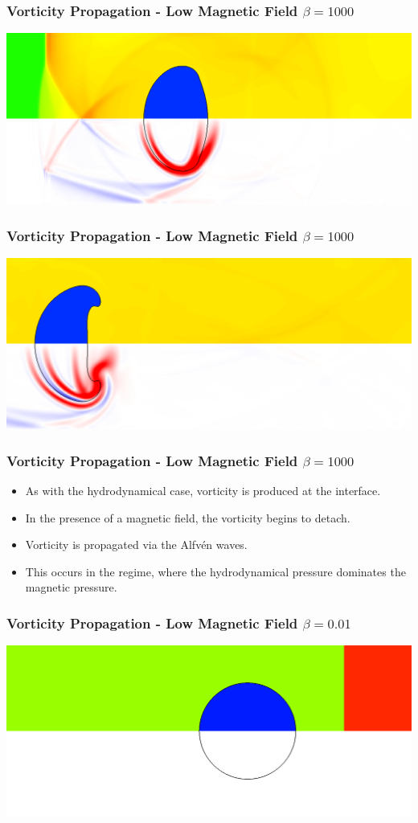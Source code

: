 \documentclass{beamer}
\begin{document}
\begin{frame}
\frametitle{Vorticity Propagation - Low Magnetic Field $\beta = 1000$}
\includegraphics[width=\textwidth]{../images/SRMHDBubbleBeta1000_t59_crop.png}
\end{frame}

\begin{frame}
\frametitle{Vorticity Propagation - Low Magnetic Field $\beta = 1000$}
\includegraphics[width=\textwidth]{../images/SRMHDBubbleBeta1000_t125_crop.png}
\end{frame}

\begin{frame}
\frametitle{Vorticity Propagation - Low Magnetic Field $\beta = 1000$}
\begin{itemize}
\item{As with the hydrodynamical case, vorticity is produced at the interface.}
\item{In the presence of a magnetic field, the vorticity begins to detach.}
\item{Vorticity is propagated via the Alfv\'{e}n waves.}
\item{This occurs in the regime, where the hydrodynamical pressure dominates the magnetic pressure.}
\end{itemize}
\end{frame}
\begin{frame}
\frametitle{Vorticity Propagation - Low Magnetic Field $\beta = 0.01$}
\includegraphics[width=\textwidth]{../images/SRMHDBubbleBeta001_t0_crop.png}
\end{frame}
\end{document}
